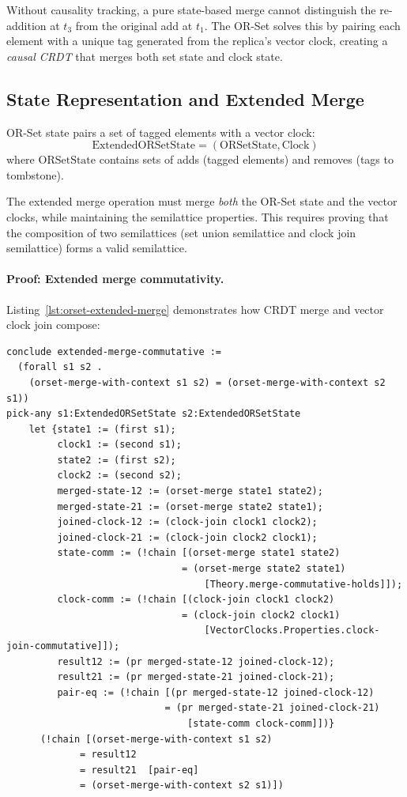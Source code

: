 Without causality tracking, a pure state-based merge cannot distinguish the re-addition at $t_3$ from the original add at $t_1$. The OR-Set solves this by pairing each element with a unique tag generated from the replica's vector clock, creating a \emph{causal CRDT} that merges both set state and clock state.

\subsection{State Representation and Extended Merge}

OR-Set state pairs a set of tagged elements with a vector clock:
\[
\text{ExtendedORSetState} = (\text{ORSetState}, \text{Clock})
\]
where $\text{ORSetState}$ contains sets of adds (tagged elements) and removes (tags to tombstone).

The extended merge operation must merge \emph{both} the OR-Set state and the vector clocks, while maintaining the semilattice properties. This requires proving that the composition of two semilattices (set union semilattice and clock join semilattice) forms a valid semilattice.

\paragraph{Proof: Extended merge commutativity.} Listing~\ref{lst:orset-extended-merge} demonstrates how CRDT merge and vector clock join compose:\\

\begin{lstlisting}[language=Athena,style=athena,label={lst:orset-extended-merge},caption={OR-Set: Composing CRDT and vector clock commutativity}]
conclude extended-merge-commutative :=
  (forall s1 s2 .
    (orset-merge-with-context s1 s2) = (orset-merge-with-context s2 s1))
pick-any s1:ExtendedORSetState s2:ExtendedORSetState
    let {state1 := (first s1);
         clock1 := (second s1);
         state2 := (first s2);
         clock2 := (second s2);
         merged-state-12 := (orset-merge state1 state2);
         merged-state-21 := (orset-merge state2 state1);
         joined-clock-12 := (clock-join clock1 clock2);
         joined-clock-21 := (clock-join clock2 clock1);
         state-comm := (!chain [(orset-merge state1 state2)
                               = (orset-merge state2 state1)
                                   [Theory.merge-commutative-holds]]);
         clock-comm := (!chain [(clock-join clock1 clock2)
                               = (clock-join clock2 clock1)
                                   [VectorClocks.Properties.clock-join-commutative]]);
         result12 := (pr merged-state-12 joined-clock-12);
         result21 := (pr merged-state-21 joined-clock-21);
         pair-eq := (!chain [(pr merged-state-12 joined-clock-12)
                            = (pr merged-state-21 joined-clock-21)
                                [state-comm clock-comm]])}
      (!chain [(orset-merge-with-context s1 s2)
             = result12
             = result21  [pair-eq]
             = (orset-merge-with-context s2 s1)])
\end{lstlisting}

